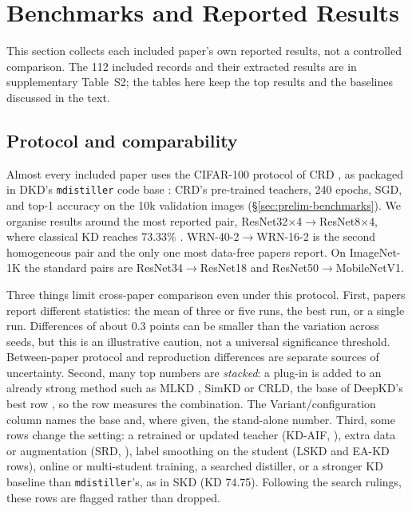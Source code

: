 \section{Benchmarks and Reported Results}
\label{sec:benchmarks}

This section collects each included paper's own reported results, not a controlled comparison. The 112 included records and their extracted results are in supplementary Table~S2; the tables here keep the top results and the baselines discussed in the text.

\subsection{Protocol and comparability}
\label{sec:bench-protocol}

Almost every included paper uses the CIFAR-100 protocol of CRD \citep{tian2020crd}, as packaged in
DKD's \texttt{mdistiller} code base \citep{zhao2022dkd}: CRD's pre-trained teachers, 240 epochs, SGD, and
top-1 accuracy on the 10k validation images (\S\ref{sec:prelim-benchmarks}). We organise results around the most reported
pair, ResNet32$\times$4$\to$ResNet8$\times$4, where classical KD reaches 73.33\% \citep[Table~6]{zhao2022dkd}.
WRN-40-2$\to$WRN-16-2 is the second homogeneous pair and the only one most data-free papers report. On
ImageNet-1K the standard pairs are ResNet34$\to$ResNet18 and ResNet50$\to$MobileNetV1.

Three things limit cross-paper comparison even under this protocol. First, papers report different
statistics: the mean of three or five runs, the best run, or a single run.
Differences of about 0.3 points can be smaller than the variation across seeds, but this is an illustrative caution, not a universal significance threshold. Between-paper protocol and reproduction differences are separate sources of uncertainty. Second, many top numbers are \emph{stacked}: a plug-in is added to an already strong method such
as MLKD \citep{jin2023mlkd}, SimKD \citep{chen2022simkd} or CRLD, the base of DeepKD's best row \citep[Table~1]{huang2025deepkd}, so the row measures the combination. The
Variant/configuration column names the base and, where given, the stand-alone number. Third, some rows change the setting:
a retrained or updated teacher (KD-AIF, \citealp{wu2025kdaif}), extra data or augmentation (SRD,
\citealp{miles2024projector}), label smoothing on the student (LSKD and EA-KD rows), online or
multi-student training, a searched distiller, or a stronger KD baseline than \texttt{mdistiller}'s, as in SKD
\citep{jeong2026skd} (KD 74.75). Following the search rulings,
these rows are flagged rather than dropped.

